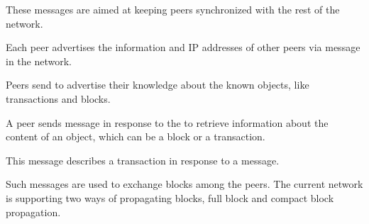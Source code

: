 These messages are aimed at keeping \bc peers synchronized with the rest of the \bc network. %

Each peer advertises the information and IP addresses of other peers via  message in the network. %

 Peers send  to advertise their knowledge about the known objects, like transactions and blocks.%

 A peer sends  message in response to the  to retrieve information about the content of an object, which can be a block or a transaction. 

 This message describes a transaction in response to a  message.%


 Such messages are used to exchange \bc blocks among the peers. 
The current \bc network is supporting two ways of propagating blocks, full block and compact block
propagation. %

